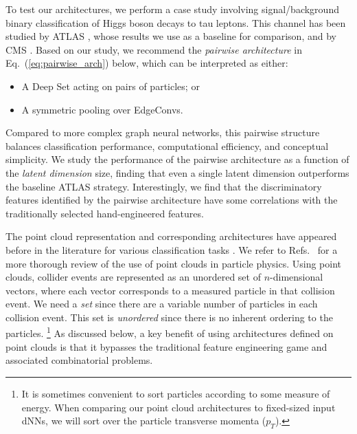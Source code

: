 \documentclass[aps,prd,twocolumn,superscriptaddress,floatfix,longbibliography,preprintnumbers,nofootinbib]{revtex4-1} %
\DeclareRobustCommand{\Eq}[1]{Eq.~(\ref{eq:#1})}
\DeclareRobustCommand{\RRefs}[1]{Refs.~\cite{#1}}
\begin{document}
To test our architectures, we perform a case study involving signal/background binary classification of Higgs boson decays to tau leptons.
%
This channel has been studied by ATLAS \cite{ATLAS:2018ynr, ATLAS:2020evk, ATLAS:2022yrq}, whose results we use as a baseline for comparison, and by CMS \cite{CMS:2014wdm, CMS:2017zyp, CMS:2021gxc, CMS:2022kdi}.
%
Based on our study, we recommend the \emph{pairwise architecture} in \Eq{pairwise_arch} below, which can be interpreted as either:
%
\begin{itemize}
\item A Deep Set acting on pairs of particles; or
\item A symmetric pooling over EdgeConvs.
\end{itemize}
%
Compared to more complex graph neural networks, this pairwise structure balances classification performance, computational efficiency, and conceptual simplicity.
%
We study the performance of the pairwise architecture as a function of the \textit{latent dimension} size, finding that even a single latent dimension outperforms the baseline ATLAS strategy.
%
Interestingly, we find that the discriminatory features identified by the pairwise architecture have some correlations with the traditionally selected hand-engineered features.




The point cloud representation and corresponding architectures have appeared before in the literature for various classification tasks \cite{Komiske:2018cqr, Qu:2019gqs, Moreno:2019bmu, Mikuni:2020wpr, Chakraborty:2020yfc, Shlomi:2020ufi, Shlomi:2020gdn, Dolan:2020qkr}. 
%
We refer to \RRefs{Duarte:2020ngm, Thais:2022iok} for a more thorough review of the use of point clouds in particle physics.
%
Using point clouds, collider events are represented as an unordered set of \(n\)-dimensional vectors, where each vector corresponds to a measured particle in that collision event.
%
We need a \textit{set} since there are a variable number of particles in each collision event.
%
This set is \textit{unordered} since there is no inherent ordering to the particles.%
%
\footnote{It is sometimes convenient to sort particles according to some measure of energy.  When comparing our point cloud architectures to fixed-sized input dNNs, we will sort over the particle transverse momenta ($p_T$).}
%
As discussed below, a key benefit of using architectures defined on point clouds is that it bypasses the traditional feature engineering game and associated combinatorial problems.
\end{document}
